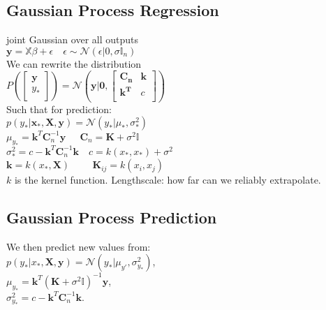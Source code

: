 
\subsection*{Gaussian Process Regression}
joint Gaussian over all outputs\\
$\mathbf{y}=\mathbb{X}\beta+\epsilon \quad \epsilon\sim \mathcal{N}(\epsilon|0,\sigma\mathbb{I}_n)$\\
We can rewrite the distribution\\
$P(\begin{bmatrix}
\mathbf{y}\\
y_*\\
\end{bmatrix}){=}\mathcal{N}(\mathbf{y}|\mathbf{0},\begin{bmatrix}
\mathbf{C_n} & \mathbf{k} \\
\mathbf{k^T} & c \\
\end{bmatrix})$\\
Such that for prediction:\\
$p(y_*|\mathbf{x_*}, \mathbf{X}, \mathbf{y}){=} \mathcal{N}(y_*|\mu_{*}, \sigma^2_{*})$\\
$\mu_{y_*} = \mathbf{k}^T\mathbf{C}_n^{-1}\mathbf{y}\quad\ \  \mathbf{C}_n=\mathbf{K}+\sigma^2\mathbb{I}$\\
$\sigma^2_{*}{=}c{-}\mathbf{k}^T\mathbf{C}_n^{-1}\mathbf{k}\quad c{=}k(x_*,x_*){+}\sigma^2$\\
$\mathbf{k}=k(x_*,\mathbf{X})\quad\ \ \ \ \ \ \mathbf{K}_{ij}=k(x_i,x_j)$\\
$k$ is the kernel function. Lengthscale: how far can we reliably extrapolate.
\subsection*{Gaussian Process Prediction}
We then predict new values from:\\
$p(y_*|x_*,\mathbf{X},\mathbf{y}) = \mathcal{N}(y_*|\mu_{y'},\sigma^2_{y_*})$,\\
$\mu_{y_*}=\mathbf{k}^T(\mathbf{K}+\sigma^2\mathbb{I})^{-1}\mathbf{y}$,\\
$\sigma^2_{y_*}=c-\mathbf{k}^T\mathbf{C}_n^{-1}\mathbf{k}$.



